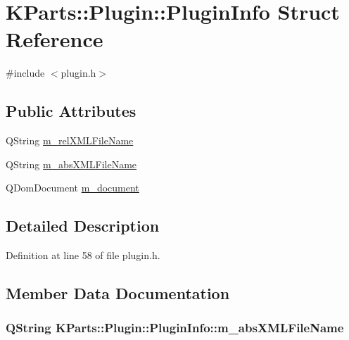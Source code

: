 \hypertarget{structKParts_1_1Plugin_1_1PluginInfo}{\section{K\+Parts\+:\+:Plugin\+:\+:Plugin\+Info Struct Reference}
\label{structKParts_1_1Plugin_1_1PluginInfo}
}


{\ttfamily \#include $<$plugin.\+h$>$}

\subsection*{Public Attributes}
\begin{DoxyCompactItemize}
\item 
Q\+String \hyperlink{structKParts_1_1Plugin_1_1PluginInfo_a02f9a1972d5e87b2d168fa7c5683649b}{m\+\_\+rel\+X\+M\+L\+File\+Name}
\item 
Q\+String \hyperlink{structKParts_1_1Plugin_1_1PluginInfo_a1351095a0ec3842ccf3c49cfd4c97478}{m\+\_\+abs\+X\+M\+L\+File\+Name}
\item 
Q\+Dom\+Document \hyperlink{structKParts_1_1Plugin_1_1PluginInfo_a5d8acab9612633d4d1f35019213ecadd}{m\+\_\+document}
\end{DoxyCompactItemize}


\subsection{Detailed Description}


Definition at line 58 of file plugin.\+h.



\subsection{Member Data Documentation}
\hypertarget{structKParts_1_1Plugin_1_1PluginInfo_a1351095a0ec3842ccf3c49cfd4c97478}{
\subsubsection[{m\+\_\+abs\+X\+M\+L\+File\+Name}]{\setlength{\rightskip}{0pt plus 5cm}Q\+String K\+Parts\+::\+Plugin\+::\+Plugin\+Info\+::m\+\_\+abs\+X\+M\+L\+File\+Name}}\label{structKParts_1_1Plugin_1_1PluginInfo_a1351095a0ec3842ccf3c49cfd4c97478}


